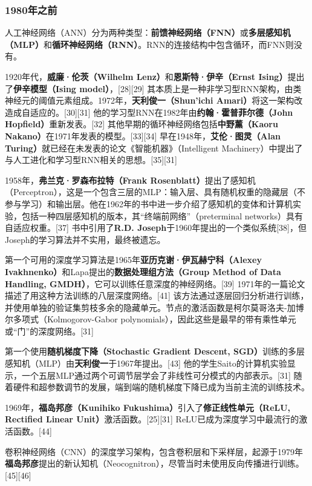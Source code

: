 \subsubsection{1980年之前}
人工神经网络（ANN）分为两种类型：\textbf{前馈神经网络（FNN）}或\textbf{多层感知机（MLP）}和\textbf{循环神经网络（RNN）}。RNN的连接结构中包含循环，而FNN则没有。

1920年代，\textbf{威廉·伦茨（Wilhelm Lenz）}和\textbf{恩斯特·伊辛（Ernst Ising）}提出了\textbf{伊辛模型（Ising model）}，[28][29] 其本质上是一种非学习型RNN架构，由类神经元的阈值元素组成。1972年，\textbf{天利俊一（Shun'ichi Amari）}将这一架构改造成自适应的。[30][31] 他的学习型RNN在1982年由\textbf{约翰·霍普菲尔德（John Hopfield）}重新发表。[32] 其他早期的循环神经网络包括\textbf{中野薰（Kaoru Nakano）}在1971年发表的模型。[33][34] 早在1948年，\textbf{艾伦·图灵（Alan Turing）}就已经在未发表的论文《智能机器》（Intelligent Machinery）中提出了与人工进化和学习型RNN相关的思想。[35][31]

1958年，\textbf{弗兰克·罗森布拉特（Frank Rosenblatt）}提出了感知机（Perceptron），这是一个包含三层的MLP：输入层、具有随机权重的隐藏层（不参与学习）和输出层。他在1962年的书中进一步介绍了感知机的变体和计算机实验，包括一种四层感知机的版本，其“终端前网络”（preterminal networks）具有自适应权重。[37] 书中引用了\textbf{R.D. Joseph}于1960年提出的一个类似系统[38]，但Joseph的学习算法并不实用，最终被遗忘。

第一个可用的深度学习算法是1965年\textbf{亚历克谢·伊瓦赫宁科（Alexey Ivakhnenko）}和Lapa提出的\textbf{数据处理组方法（Group Method of Data Handling, GMDH）}，它可以训练任意深度的神经网络。[39] 1971年的一篇论文描述了用这种方法训练的八层深度网络。[41] 该方法通过逐层回归分析进行训练，并使用单独的验证集剪枝多余的隐藏单元。节点的激活函数是柯尔莫哥洛夫-加博尔多项式（Kolmogorov-Gabor polynomials），因此这些是最早的带有乘性单元或“门”的深度网络。[31]

第一个使用\textbf{随机梯度下降（Stochastic Gradient Descent, SGD）}训练的多层感知机（MLP）由\textbf{天利俊一}于1967年提出。[43] 他的学生Saito的计算机实验显示，一个五层MLP通过两个可调节层学会了非线性可分模式的内部表示。[31] 随着硬件和超参数调节的发展，端到端的随机梯度下降已成为当前主流的训练技术。

1969年，\textbf{福岛邦彦（Kunihiko Fukushima）}引入了\textbf{修正线性单元（ReLU, Rectified Linear Unit）}激活函数。[25][31] ReLU已成为深度学习中最流行的激活函数。[44]

卷积神经网络（CNN）的深度学习架构，包含卷积层和下采样层，起源于1979年\textbf{福岛邦彦}提出的新认知机（Neocognitron），尽管当时未使用反向传播进行训练。[45][46]

